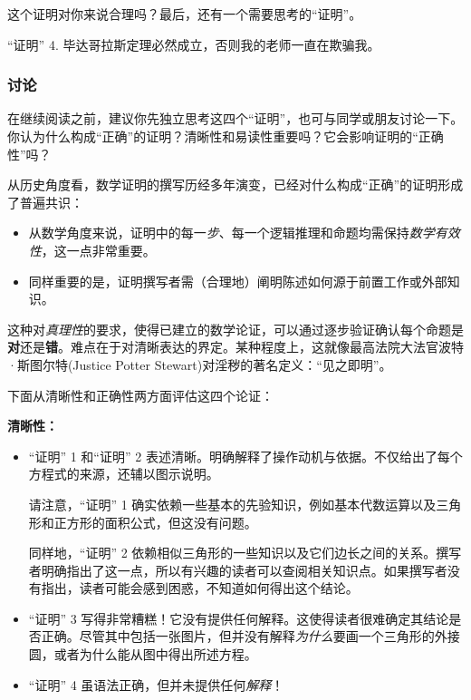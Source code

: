 这个证明对你来说合理吗？最后，还有一个需要思考的``证明''。

\begin{proofs}{``证明'' 4.}
    毕达哥拉斯定理必然成立，否则我的老师一直在欺骗我。
\end{proofs} 

\subsubsection*{讨论}

在继续阅读之前，建议你先独立思考这四个``证明''，也可与同学或朋友讨论一下。你认为什么构成``正确''的证明？清晰性和易读性重要吗？它会影响证明的``正确性''吗？

从历史角度看，数学证明的撰写历经多年演变，已经对什么构成``正确''的证明形成了普遍共识：

\begin{itemize}
    \item 从数学角度来说，证明中的每一\emph{步}、每一个逻辑推理和命题均需保持\emph{数学有效性}，这一点非常重要。
    \item 同样重要的是，证明撰写者需（合理地）阐明陈述如何源于前置工作或外部知识。
\end{itemize}

这种对\emph{真理性}的要求，使得已建立的数学论证，可以通过逐步验证确认每个命题是\textbf{对}还是\textbf{错}。难点在于对清晰表达的界定。某种程度上，这就像最高法院大法官波特·斯图尔特(Justice Potter Stewart)对淫秽的著名定义：``见之即明''。

下面从清晰性和正确性两方面评估这四个论证：

\textbf{清晰性：}

\begin{itemize}
    \item ``证明'' 1 和``证明'' 2 表述清晰。明确解释了操作动机与依据。不仅给出了每个方程式的来源，还辅以图示说明。
    
    请注意，``证明'' 1 确实依赖一些基本的先验知识，例如基本代数运算以及三角形和正方形的面积公式，但这没有问题。

    同样地，``证明'' 2 依赖相似三角形的一些知识以及它们边长之间的关系。撰写者明确指出了这一点，所以有兴趣的读者可以查阅相关知识点。如果撰写者没有指出，读者可能会感到困惑，不知道如何得出这个结论。
    \item ``证明'' 3 写得非常糟糕！它没有提供任何解释。这使得读者很难确定其结论是否正确。尽管其中包括一张图片，但并没有解释\emph{为什么}要画一个三角形的外接圆，或者为什么能从图中得出所述方程。
    \item ``证明'' 4 虽语法正确，但并未提供任何\emph{解释}！
\end{itemize}

